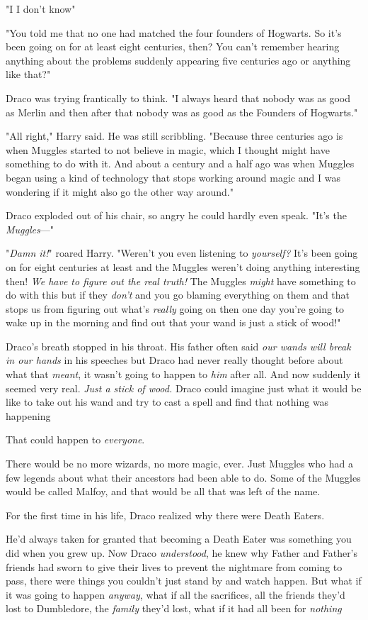 "I{\el} I don't know{\el}"

"You told me that no one had matched the four founders of Hogwarts. So it's
been going on for at least eight centuries, then? You can't remember hearing
anything about the problems suddenly appearing five centuries ago or anything
like that?"

Draco was trying frantically to think. "I always heard that nobody was as good
as Merlin and then after that nobody was as good as the Founders of Hogwarts."

"All right," Harry said. He was still scribbling. "Because three centuries ago
is when Muggles started to not believe in magic, which I thought might have
something to do with it. And about a century and a half ago was when Muggles
began using a kind of technology that stops working around magic and I was
wondering if it might also go the other way around."

Draco exploded out of his chair, so angry he could hardly even speak. "It's the
\emph{Muggles}—"

"\emph{Damn it!}" roared Harry. "Weren't you even listening to \emph{yourself?}
It's been going on for eight centuries at least and the Muggles weren't doing
anything interesting then! \emph{We have to figure out the real truth!} The
Muggles \emph{might} have something to do with this but if they \emph{don't}
and you go blaming everything on them and that stops us from figuring out
what's \emph{really} going on then one day you're going to wake up in the
morning and find out that your wand is just a stick of wood!"

Draco's breath stopped in his throat. His father often said \emph{our wands
will break in our hands} in his speeches but Draco had never really thought
before about what that \emph{meant}, it wasn't going to happen to \emph{him}
after all. And now suddenly it seemed very real. \emph{Just a stick of wood.}
Draco could imagine just what it would be like to take out his wand and try to
cast a spell and find that nothing was happening{\el}

That could happen to \emph{everyone}.

There would be no more wizards, no more magic, ever. Just Muggles who had a few
legends about what their ancestors had been able to do. Some of the Muggles
would be called Malfoy, and that would be all that was left of the name.

For the first time in his life, Draco realized why there were Death Eaters.

He'd always taken for granted that becoming a Death Eater was something you did
when you grew up. Now Draco \emph{understood}, he knew why Father and Father's
friends had sworn to give their lives to prevent the nightmare from coming to
pass, there were things you couldn't just stand by and watch happen. But what
if it was going to happen \emph{anyway}, what if all the sacrifices, all the
friends they'd lost to Dumbledore, the \emph{family} they'd lost, what if it
had all been for \emph{nothing{\el}}

